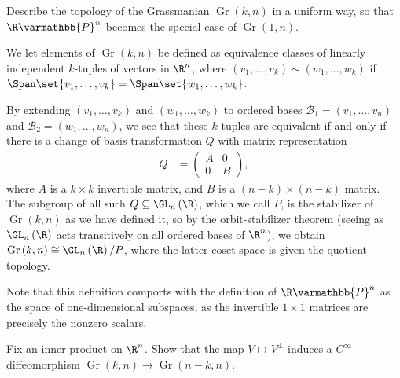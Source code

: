 \documentclass[10pt]{mypackage}
\renewcommand*{\mathbb}[1]{\varmathbb{#1}}
\begin{document}
\RaggedRight
\begin{problem}[Problem 1]
  Describe the topology of the Grassmanian $\operatorname{Gr}\left( k,n \right)$ in a uniform way, so that $\R\mathbb{P}^n$ becomes the special case of $\operatorname{Gr}\left( 1,n \right)$.
\end{problem}
\begin{solution}
We let elements of $\operatorname{Gr}\left( k,n \right)$ be defined as equivalence classes of linearly independent $k$-tuples of vectors in $\R^n$, where $\left( v_1,\dots,v_k \right) \sim \left( w_1,\dots,w_k \right)$ if $\Span \set{v_1,\dots,v_k} = \Span\set{w_1,\dots,w_k} $.\newline

By extending $\left( v_1,\dots,v_k \right)$ and $\left( w_1,\dots,w_k \right)$ to ordered bases $\mathcal{B}_1 = \left( v_1,\dots,v_n \right)$ and $\mathcal{B}_2 = \left( w_1,\dots,w_n \right)$, we see that these $k$-tuples are equivalent if and only if there is a change of basis transformation $Q$ with matrix representation
\begin{align*}
  Q &= \begin{pmatrix}A & 0 \\ 0 & B\end{pmatrix},
\end{align*}
where $A$ is a $k\times k$ invertible matrix, and $B$ is a $\left( n-k \right)\times \left( n-k \right)$ matrix. The subgroup of all such $Q\subseteq \GL_n\left( \R \right)$, which we call $P$, is the stabilizer of $\operatorname{Gr}\left( k,n \right)$ as we have defined it, so by the orbit-stabilizer theorem (seeing as $\GL_n\left( \R \right)$ acts transitively on all ordered bases of $\R^n$), we obtain $\operatorname{Gr}\left( k,n \right)\cong \GL_n\left( \R \right)/P$, where the latter coset space is given the quotient topology.\newline

Note that this definition comports with the definition of $\R\mathbb{P}^{n}$ as the space of one-dimensional subspaces, as the invertible $1\times 1$ matrices are precisely the nonzero scalars.
\end{solution}
\begin{problem}[Problem 2]
  Fix an inner product on $\R^n$. Show that the map $V\mapsto V^{\perp}$ induces a $C^{\infty}$ diffeomorphism $\operatorname{Gr}\left( k,n \right)\rightarrow \operatorname{Gr}\left( n-k,n \right)$.
\end{problem}
\end{document}

